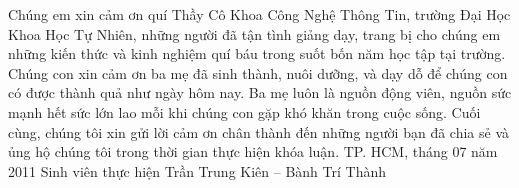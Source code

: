  
 
\begin{acknowledgements}      


Chúng em xin cảm ơn quí Thầy Cô Khoa Công Nghệ Thông Tin, trường Đại Học Khoa Học Tự Nhiên, những người đã tận tình giảng dạy, trang bị cho chúng em những kiến thức và kinh nghiệm quí báu trong suốt bốn năm học tập tại trường.
Chúng con xin cảm ơn ba mẹ đã sinh thành, nuôi dưỡng, và dạy dỗ để chúng con có được thành quả như ngày hôm nay. Ba mẹ luôn là nguồn động viên, nguồn sức mạnh hết sức lớn lao mỗi khi chúng con gặp khó khăn trong cuộc sống.
Cuối cùng, chúng tôi xin gửi lời cảm ơn chân thành đến những người bạn đã chia sẻ và ủng hộ chúng tôi trong thời gian thực hiện khóa luận.
TP. HCM, tháng 07 năm 2011
Sinh viên thực hiện
Trần Trung Kiên – Bành Trí Thành


\end{acknowledgements}
  